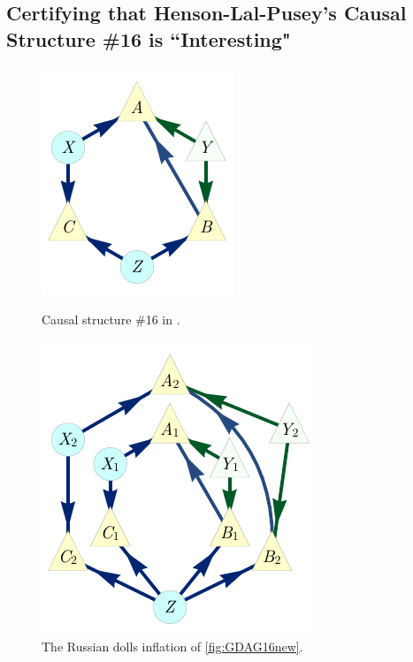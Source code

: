 \documentclass[aps,english,10pt,superscriptaddress,onecolumn,twoside,longbibliography,pra,floatfix,fleqn,nofootinbib]{revtex4-1}
\theoremstyle{definition}
\newcounter{example}[section]
\begin{document}
\subsection{Certifying that Henson-Lal-Pusey's Causal Structure \#16 is ``Interesting"} 
\label{example:Pienaar}

\begin{figure}[htb]
\centering
\begin{minipage}[t]{0.4\linewidth}
\centering
\includegraphics[scale=1]{scen16DAG.pdf}
\caption{Causal structure \#16 in \cite{pusey2014gdag}.}\label{fig:GDAG16new}
\end{minipage}
\hfill
\begin{minipage}[t]{0.5\linewidth}
\centering
\includegraphics[scale=1]{scen16InflationDAGv2.pdf}
\caption{The Russian dolls inflation of \cref{fig:GDAG16new}.}\label{fig:Inflated16new}
\end{minipage}
\end{figure}
\end{document}
